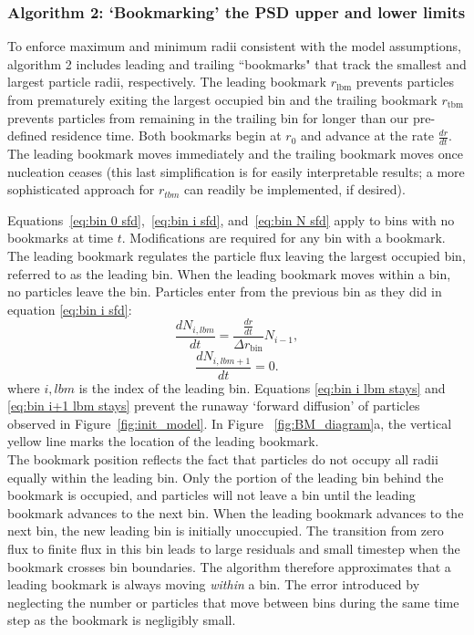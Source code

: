\documentclass[final,3p,times,twocolumn, 12pt]{elsarticle}    %
\begin{document}
\subsubsection{Algorithm 2: `Bookmarking' the PSD upper and lower limits}
To enforce maximum and minimum radii consistent with the model assumptions, algorithm 2 includes leading and trailing ``bookmarks" that track the smallest and largest particle radii, respectively. The leading bookmark $r_\mathrm{lbm}$ prevents particles from prematurely exiting the largest occupied bin and the trailing bookmark $r_\mathrm{tbm}$ prevents particles from remaining in the trailing bin for longer than our pre-defined residence time. Both bookmarks begin at $r_0$ and advance at the rate $\frac{dr}{dt}$. The leading bookmark moves immediately and the trailing bookmark moves once nucleation ceases (this last simplification is for easily interpretable results; a more sophisticated approach for $r_{tbm}$ can readily be implemented, if desired). 

Equations~\ref{eq:bin 0 sfd},~\ref{eq:bin i sfd}, and~\ref{eq:bin N sfd} apply to bins with no bookmarks at time $t$. Modifications are required for any bin with a bookmark. The leading bookmark regulates the particle flux leaving the largest occupied bin, referred to as the leading bin. When the leading bookmark moves within a bin, no particles leave the bin. Particles enter from the previous bin as they did in equation \ref{eq:bin i sfd}:
\begin{equation}
    \frac{dN_{i,lbm}}{dt}=\frac{\frac{dr}{dt}}{\Delta r_{\mathrm{bin}}}N_{i-1},
    \label{eq:bin i lbm stays}
\end{equation}
\begin{equation}
    \frac{dN_{i,lbm+1}}{dt}=0.
     \label{eq:bin i+1 lbm stays}
\end{equation}
where $i,lbm$ is the index of the leading bin. Equations \ref{eq:bin i lbm stays} and \ref{eq:bin i+1 lbm stays} prevent the runaway `forward diffusion' of particles observed in Figure~\ref{fig:init_model}. In Figure ~\ref{fig:BM_diagram}a, the vertical yellow line marks the location of the leading bookmark.\\

The bookmark position reflects the fact that particles do not occupy all radii equally within the leading bin. Only the portion of the leading bin behind the bookmark is occupied, and particles will not leave a bin until the leading bookmark advances to the next bin. When the leading bookmark advances to the next bin, the new leading bin is initially unoccupied. The transition from zero flux to finite flux in this bin leads to large residuals and small timestep when the bookmark crosses bin boundaries. The algorithm therefore approximates that a leading bookmark is always moving \emph{within} a bin. The error introduced by neglecting the number or particles that move between bins during the same time step as the bookmark is negligibly small.\\
\end{document}
